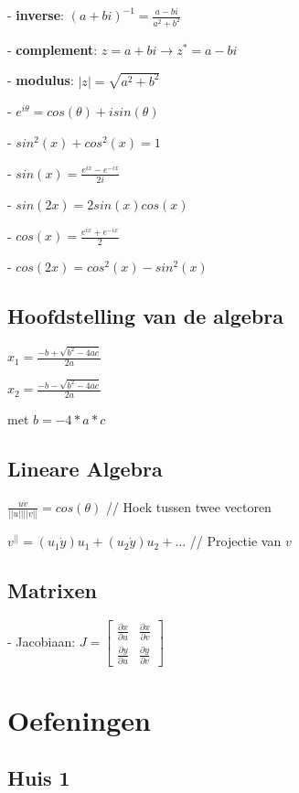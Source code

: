 \documentclass[a4paper]{report}
\begin{document}
- \textbf{inverse}: $(a + bi)^{-1} = \frac{a - bi}{a^2 + b^2}$

- \textbf{complement}: $z = a + bi \rightarrow z^* = a - bi$

- \textbf{modulus}: $|z| = \sqrt{a^2 + b^2}$

- $e^{i\theta} = cos(\theta) + i sin(\theta)$

- $sin^2(x) + cos^2(x) = 1$

- $sin(x) = \frac{e^{ix} - e^{-ix}}{2i}$

- $sin(2x) = 2sin(x)cos(x)$

- $cos(x) = \frac{e^{ix} + e^{-ix}}{2}$

- $cos(2x) = cos^2(x) - sin^2(x)$

\subsection*{Hoofdstelling van de algebra}

$x_1 = \frac{-b + \sqrt{b^2 - 4ac}}{2a}$

$x_2 = \frac{-b - \sqrt{b^2 - 4ac}}{2a}$

met $b = -4*a*c$

\subsection*{Lineare Algebra}

$\frac{u\dot v}{||u|| ||v||} = cos(\theta)$ // Hoek tussen twee vectoren

$v^{||} = (u_1 \dot y) u_1 + (u_2 \dot y) u_2 + ...$ // Projectie van $v$

\subsection*{Matrixen}

- Jacobiaan: $J = \begin{bmatrix} \frac{\partial x}{\partial u} & \frac{\partial x}{\partial v} \\ \frac{\partial y}{\partial u} & \frac{\partial y}{\partial v} \end{bmatrix}$

\section*{Oefeningen}

\subsection*{Huis 1}
\end{document}
